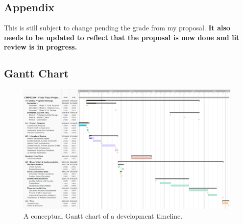 \documentclass[12pt]{report}
\begin{document}
    \begin{landscape}

    \chapter{Appendix}
    
    \begin{tcolorbox}[colback=red!5!white,colframe=red!75!black,title=Copied from proposal]
        This is still subject to change pending the grade from my proposal. 
        \textbf{It also needs to be updated to reflect that the proposal is now done and lit review is in progress.}
    \end{tcolorbox}

    \section{Gantt Chart}



    \begin{figure}[H]
        \centering
        \includegraphics[width=.75\linewidth]{ProposalGantt.png}
        \caption{A conceptual Gantt chart of a development timeline.}
        \label{fig:gantt}
    \end{figure}

    \end{landscape}

    \printbibliography[keyword={refs}, title = {References}]

    \nocite{IBMAIDef}
    \nocite{ICOAIDef}
    \nocite{IBMGenAI}
    \nocite{MITGenAI}
    \nocite{CloudflareLLM}
    \nocite{IBMNLP}

    \printbibliography[keyword={bib}]
\end{document}

